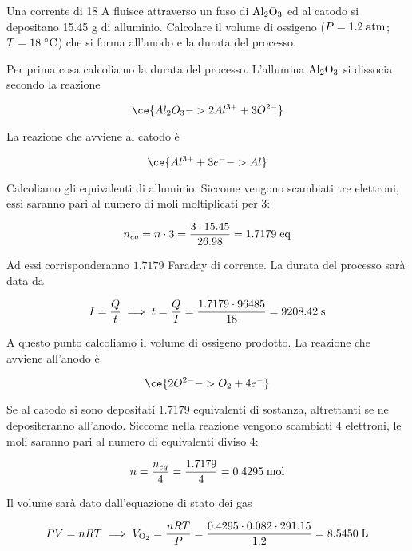 \newpage

\begin{esercizio}
    Una corrente di 18 A fluisce attraverso un fuso di $\rm Al_2O_3$ ed al catodo si depositano 15.45 g di alluminio. Calcolare il volume di ossigeno ($P=1.2 \; \rm atm$; $T=18\; ^{\circ} \rm C$) che si forma all'anodo e la durata del processo.
\end{esercizio}
\begin{soluzione}
    Per prima cosa calcoliamo la durata del processo. L'allumina $\rm Al_2O_3$ si dissocia secondo la reazione 

$$\ce{Al_2O_3 -> 2Al^{3+} + 3O^{2-}}$$

La reazione che avviene al catodo è

$$\ce{Al^{3+} + 3e^- -> Al }$$

Calcoliamo gli equivalenti di alluminio. Siccome vengono scambiati tre elettroni, essi saranno pari al numero di moli moltiplicati per 3:

$$n_{eq}=n \cdot 3
=\frac{3 \cdot 15.45}{26.98}
=1.7179 \; \rm eq$$

Ad essi corrisponderanno $1.7179$ Faraday di corrente. La durata del processo sarà data da

$$I=\frac{Q}{t}
\implies
t=\frac{Q}{I}=\frac{1.7179 \cdot 96485}{18}
=9208.42 \; \rm s$$

A questo punto calcoliamo il volume di ossigeno prodotto. La reazione che avviene all'anodo è

$$\ce{2O^{2-} -> O_2 + 4e^-}$$

Se al catodo si sono depositati $1.7179$ equivalenti di sostanza, altrettanti se ne depositeranno all'anodo. Siccome nella reazione vengono scambiati 4 elettroni, le moli saranno pari al numero di equivalenti diviso 4:

$$n=\frac{n_{eq}}{4}
=\frac{1.7179}{4}
=0.4295 \; \rm mol$$

Il volume sarà dato dall'equazione di stato dei gas

$$PV=nRT
\implies
V_{\rm O_2}=\frac{nRT}{P}=\frac{0.4295 \cdot 0.082 \cdot 291.15}{1.2}=8.5450 \; \rm L$$
\end{soluzione}

\newpage


